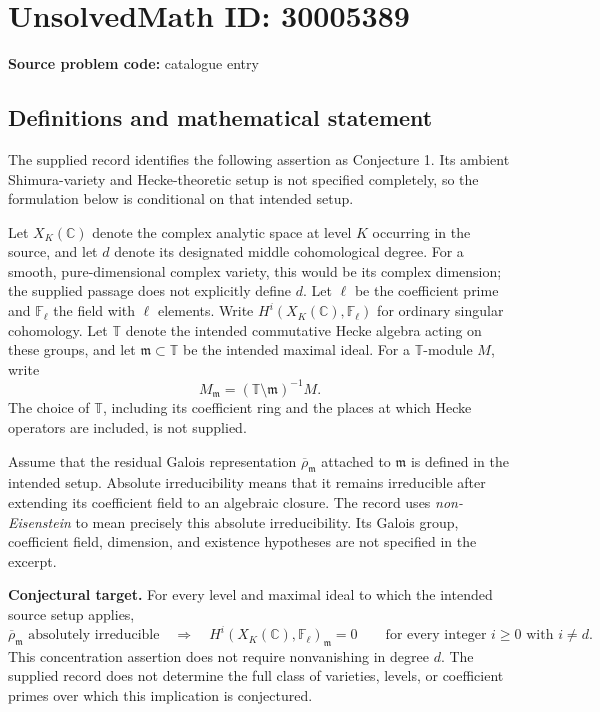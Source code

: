 \documentclass[11pt]{article}
\newcommand{\C}{\mathbb{C}}
\newcommand{\F}{\mathbb{F}}
\begin{document}
\section*{UnsolvedMath ID: 30005389}
\textbf{Source problem code:} catalogue entry
\subsection{Definitions and mathematical statement}
The supplied record identifies the following assertion as Conjecture 1. Its ambient Shimura-variety and Hecke-theoretic setup is not specified completely, so the formulation below is conditional on that intended setup.

Let \(X_K(\C)\) denote the complex analytic space at level \(K\) occurring in the source, and let \(d\) denote its designated middle cohomological degree. For a smooth, pure-dimensional complex variety, this would be its complex dimension; the supplied passage does not explicitly define \(d\). Let \(\ell\) be the coefficient prime and \(\F_\ell\) the field with \(\ell\) elements. Write \(H^i(X_K(\C),\F_\ell)\) for ordinary singular cohomology. Let \(\mathbb T\) denote the intended commutative Hecke algebra acting on these groups, and let \(\mathfrak m\subset\mathbb T\) be the intended maximal ideal. For a \(\mathbb T\)-module \(M\), write
\[
M_{\mathfrak m}=(\mathbb T\setminus\mathfrak m)^{-1}M.
\]
The choice of \(\mathbb T\), including its coefficient ring and the places at which Hecke operators are included, is not supplied.

Assume that the residual Galois representation \(\overline\rho_{\mathfrak m}\) attached to \(\mathfrak m\) is defined in the intended setup. Absolute irreducibility means that it remains irreducible after extending its coefficient field to an algebraic closure. The record uses \emph{non-Eisenstein} to mean precisely this absolute irreducibility. Its Galois group, coefficient field, dimension, and existence hypotheses are not specified in the excerpt.

\textbf{Conjectural target.} For every level and maximal ideal to which the intended source setup applies,
\[
\overline\rho_{\mathfrak m}\text{ absolutely irreducible}
\quad\Longrightarrow\quad
H^i(X_K(\C),\F_\ell)_{\mathfrak m}=0
\qquad\text{for every integer }i\geq 0\text{ with }i\neq d.
\]
This concentration assertion does not require nonvanishing in degree \(d\). The supplied record does not determine the full class of varieties, levels, or coefficient primes over which this implication is conjectured.
\end{document}
